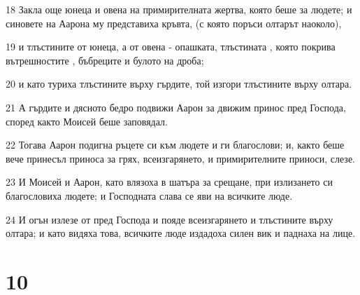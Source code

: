\par 18 Закла още юнеца и овена на примирителната жертва, която беше за людете; и синовете на Аарона му представиха кръвта, (с която поръси олтарът наоколо),
\par 19 и тлъстините от юнеца, а от овена - опашката, тлъстината , която покрива вътрешностите , бъбреците и булото на дроба;
\par 20 и като туриха тлъстините върху гърдите, той изгори тлъстините върху олтара.
\par 21 А гърдите и дясното бедро подвижи Аарон за движим принос пред Господа, според както Моисей беше заповядал.
\par 22 Тогава Аарон подигна ръцете си към людете и ги благослови; и, както беше вече принесъл приноса за грях, всеизгарянето, и примирителните приноси, слезе.
\par 23 И Моисей и Аарон, като влязоха в шатъра за срещане, при излизането си благословиха людете; и Господната слава се яви на всичките люде.
\par 24 И огън излезе от пред Господа и пояде всеизгарянето и тлъстините върху олтара; и като видяха това, всичките люде издадоха силен вик и паднаха на лице.

\chapter{10}

